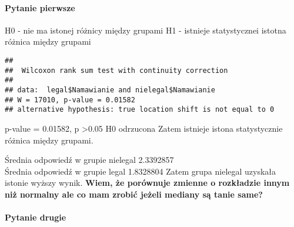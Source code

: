 \documentclass[]{article}
\newenvironment{Shaded}{\begin{snugshade}}{\end{snugshade}}
\newcommand{\KeywordTok}[1]{\textcolor[rgb]{0.13,0.29,0.53}{\textbf{#1}}}
\newcommand{\DataTypeTok}[1]{\textcolor[rgb]{0.13,0.29,0.53}{#1}}
\newcommand{\DecValTok}[1]{\textcolor[rgb]{0.00,0.00,0.81}{#1}}
\newcommand{\StringTok}[1]{\textcolor[rgb]{0.31,0.60,0.02}{#1}}
\newcommand{\CommentTok}[1]{\textcolor[rgb]{0.56,0.35,0.01}{\textit{#1}}}
\newcommand{\OperatorTok}[1]{\textcolor[rgb]{0.81,0.36,0.00}{\textbf{#1}}}
\newcommand{\NormalTok}[1]{#1}
\let\oldparagraph\paragraph
\renewcommand{\paragraph}[1]{\oldparagraph{#1}\mbox{}}
\begin{document}
\begin{Shaded}
\end{Shaded}

\paragraph{Pytanie pierwsze}\label{pytanie-pierwsze}

H0 - nie ma istonej różnicy między grupami H1 - istnieje statystycznei
istotna różnica między grupami

\begin{Shaded}
\end{Shaded}

\begin{verbatim}
## 
##  Wilcoxon rank sum test with continuity correction
## 
## data:  legal$Namawianie and nielegal$Namawianie
## W = 17010, p-value = 0.01582
## alternative hypothesis: true location shift is not equal to 0
\end{verbatim}

p-value = 0.01582, p \textgreater{}0.05 H0 odrzucona Zatem istnieje
istona statystycznie różnica między grupami.

Średnia odpowiedź w grupie nielegal 2.3392857\\
Średnia odpowiedź w grupie legal 1.8328804 Zatem grupa nielegal uzyskała
istonie wyższy wynik. \textbf{Wiem, że porównuje zmienne o rozkładzie
innym niż normalny ale co mam zrobić jeżeli mediany są tanie same?}

\paragraph{Pytanie drugie}\label{pytanie-drugie}
\end{document}

